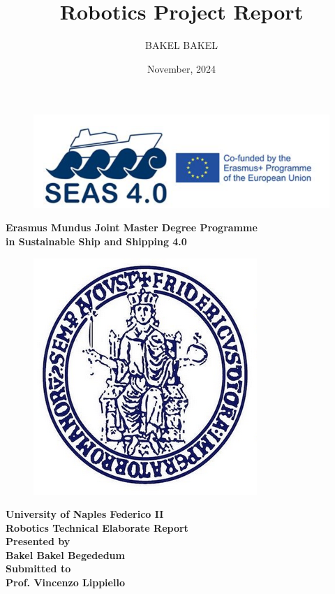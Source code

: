 \documentclass[12pt]{report}
\title{Robotics Project Report}
\author{BAKEL BAKEL}
\date{November, 2024}
\begin{document}
	

	\begin{figure}[H]
		\centering
		\includegraphics[scale=1.3]{logo} %
	\end{figure}
	\begin{center}
	\fontsize{16}{20}\selectfont\textbf{Erasmus Mundus Joint Master Degree Programme \\[0.5cm]
			in Sustainable Ship and Shipping 4.0}
	\end{center}
	\begin{figure}[H]
		\centering
		\includegraphics[scale=0.8]{Unina} %
	\end{figure}

	\begin{center}
		\fontsize{16}{20}\selectfont
		\textbf{University of Naples Federico II} \\[0.5cm]
		\textbf{Robotics Technical Elaborate Report} \\[1cm]
		\textbf{Presented by} \\[0.3cm]
		\textbf{Bakel Bakel Begededum} \\[1cm]
		\textbf{Submitted to} \\[0.3cm]
		\textbf{Prof. Vincenzo Lippiello}
	\end{center}
	
\end{document}
